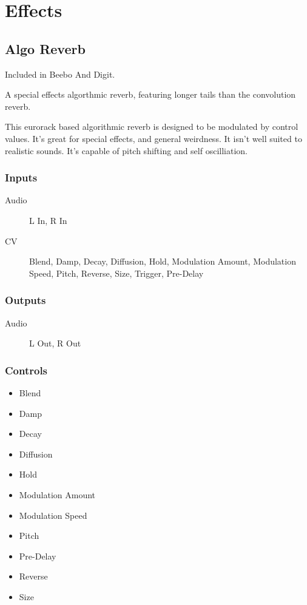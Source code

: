 \section{Effects}

\subsection{Algo Reverb}

Included in Beebo And Digit.

A special effects algorthmic reverb, featuring longer tails than the convolution reverb.

This eurorack based algorithmic reverb is designed to be modulated by control values.
                 It's great for special effects, and general weirdness. It isn't well suited to realistic sounds. It's capable of pitch shifting and self oscilliation.

\subsubsection{Inputs}
\begin{description}
\item [Audio] L In, R In
\item [CV] Blend, Damp, Decay, Diffusion, Hold, Modulation Amount, Modulation Speed, Pitch, Reverse, Size, Trigger, Pre-Delay
\end{description}

\subsubsection{Outputs}
\begin{description}
\item [Audio] L Out, R Out
\end{description}

\subsubsection{Controls}
\begin{itemize}
\item Blend
\item Damp
\item Decay
\item Diffusion
\item Hold
\item Modulation Amount
\item Modulation Speed
\item Pitch
\item Pre-Delay
\item Reverse
\item Size
\end{itemize}

